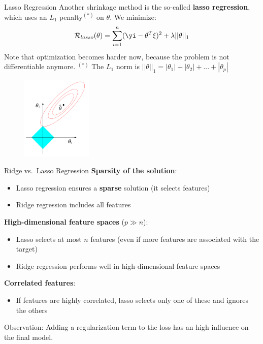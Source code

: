 \begin{vbframe}{Lasso Regression}
Another shrinkage method is the so-called \textbf{lasso regression},
which uses an \(L_1\) penalty\(^{(*)}\) on \(\theta\). We minimize:
\vspace{-0.1cm}
\[
\mathcal{R}_{lasso}(\theta) = \sum_{i=1}^n (\yi - \theta^T \xi)^2 + \lambda ||\theta||_1
\]
Note that optimization becomes harder now, because the problem is not
differentiable anymore.
$^{(*)}$ The $L_1$ norm is $||\theta||_1 = |\theta_1| + |\theta_2| + ... + |\theta_p|$
\vspace{-0.1cm}
\begin{figure}
\center
\includegraphics[width=0.3\textwidth]{plots/lasso.png}\\
\end{figure}
\end{vbframe}


\begin{frame}{Ridge vs.~Lasso Regression}
\textbf{Sparsity of the solution}:
\begin{itemize}
\item Lasso regression ensures a \textbf{sparse} solution (it selects features)
\item Ridge regression includes all features
\end{itemize}

\textbf{High-dimensional feature spaces} (\(p \gg n\)):

\begin{itemize}
\item Lasso selects at most \(n\) features (even if more features are associated with the target)
\item Ridge regression performs well in high-dimensional feature spaces
\end{itemize}

\textbf{Correlated features}:

\begin{itemize}
\item If features are highly correlated, lasso selects only one of these and ignores the others
\end{itemize}

Observation: Adding a regularization term to the loss has an high influence on the final model.
\end{frame}


